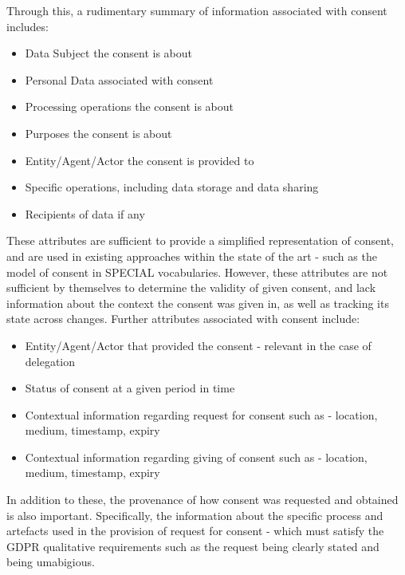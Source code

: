 Through this, a rudimentary summary of information associated with consent includes:
\begin{itemize}
    \item Data Subject the consent is about
    \item Personal Data associated with consent
    \item Processing operations the consent is about
    \item Purposes the consent is about
    \item Entity/Agent/Actor the consent is provided to
    \item Specific operations, including data storage and data sharing
    \item Recipients of data if any
\end{itemize}
These attributes are sufficient to provide a simplified representation of consent, and are used in existing approaches within the state of the art - such as the model of consent in SPECIAL vocabularies. However, these attributes are not sufficient by themselves to determine the validity of given consent, and lack information about the context the consent was given in, as well as tracking its state across changes. Further attributes associated with consent include:
\begin{itemize}
    \item Entity/Agent/Actor that provided the consent - relevant in the case of delegation
    \item Status of consent at a given period in time
    \item Contextual information regarding request for consent such as - location, medium, timestamp, expiry
    \item Contextual information regarding giving of consent such as - location, medium, timestamp, expiry
\end{itemize}
In addition to these, the provenance of how consent was requested and obtained is also important.
Specifically, the information about the specific process and artefacts used in the provision of request for consent - which must satisfy the GDPR qualitative requirements such as the request being clearly stated and being umabigious.

